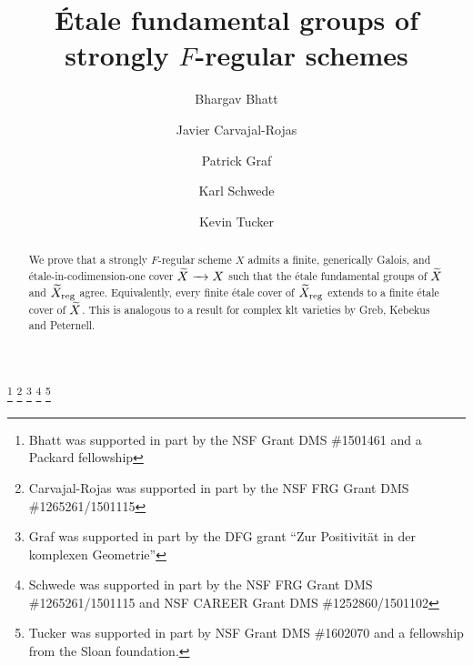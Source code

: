 \documentclass[12pt]{amsart}
\numberwithin{equation}{theorem}
\renewcommand{\:}{\colon}
\theoremstyle{theorem}
\begin{document}
\title{\'Etale fundamental groups of strongly $F$-regular schemes}
\author[B.~Bhatt]{Bhargav Bhatt}
\author[J.~Carvajal-Rojas]{Javier Carvajal-Rojas}
\author[P.~Graf]{Patrick Graf}
\author[K.~Schwede]{Karl Schwede}
\author[K.~Tucker]{Kevin Tucker}
\address{Department of Mathematics\\ University of Michigan\\Ann Arbor\\ MI 48109}
\address{Department of Mathematics\\ University of Utah\\ Salt Lake City\\ UT 84112 \newline\indent
Escuela de Matem\'atica\\ Universidad de Costa Rica\\ San Jos\'e 11501\\ Costa Rica}
\address{Lehrstuhl f\"ur Mathematik I, Universit\"at Bay\-reuth, 95440 Bayreuth, Germany}
\address{Department of Mathematics\\ University of Utah\\ Salt Lake City\\ UT 84112}
\address{Department of Mathematics\\ University of Illinois at Chicago\\Chicago\\ IL 60607}

\thanks{Bhatt was supported in part by the NSF Grant DMS \#1501461 and a Packard fellowship}
\thanks{Carvajal-Rojas was supported in part by the NSF FRG Grant DMS \#1265261/1501115}
\thanks{Graf was supported in part by the DFG grant ``Zur Positivit\"at in der komplexen
Geometrie''}
\thanks{Schwede was supported in part by the NSF FRG Grant DMS \#1265261/1501115 and NSF CAREER Grant DMS \#1252860/1501102}
\thanks{Tucker was supported in part by NSF Grant DMS \#1602070 and a fellowship from the Sloan foundation.}



\begin{abstract}
We prove that a strongly $F$-regular scheme $X$ admits a finite, generically Galois, and \'etale-in-codimension-one  cover $\widetilde X \xrightarrow{\ \ } X$ such that the \'etale fundamental groups of $\widetilde X$ and $\widetilde X_{\operatorname{{reg}}}$ agree.
Equivalently, every finite \'etale cover of $\widetilde X_{\operatorname{{reg}}}$ extends to a finite \'etale cover of $\widetilde X$.
This is analogous to a result for complex klt varieties by Greb, Kebekus and Peternell.
\end{abstract}
\end{document}
